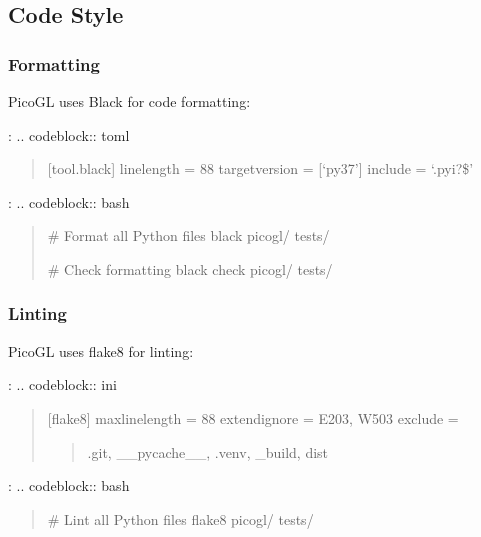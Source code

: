 \documentclass[a4paper,10pt,english,openany,oneside]{sphinxmanual}
\begin{document}
\subsection{Code Style}
\label{\detokenize{contributing:code-style}}

\subsubsection{Formatting}
\label{\detokenize{contributing:formatting}}
\sphinxAtStartPar
PicoGL uses Black for code formatting:

\sphinxAtStartPar
{}:
.. code\sphinxhyphen{}block:: toml
\begin{quote}

\sphinxAtStartPar
{[}tool.black{]}
line\sphinxhyphen{}length = 88
target\sphinxhyphen{}version = {[}‘py37’{]}
include = ‘.pyi?\$’
\end{quote}

\sphinxAtStartPar
{}:
.. code\sphinxhyphen{}block:: bash
\begin{quote}

\sphinxAtStartPar
\# Format all Python files
black picogl/ tests/

\sphinxAtStartPar
\# Check formatting
black \textendash{}check picogl/ tests/
\end{quote}


\subsubsection{Linting}
\label{\detokenize{contributing:linting}}
\sphinxAtStartPar
PicoGL uses flake8 for linting:

\sphinxAtStartPar
{}:
.. code\sphinxhyphen{}block:: ini
\begin{quote}

\sphinxAtStartPar
{[}flake8{]}
max\sphinxhyphen{}line\sphinxhyphen{}length = 88
extend\sphinxhyphen{}ignore = E203, W503
exclude =
\begin{quote}

\sphinxAtStartPar
.git,
\_\_pycache\_\_,
.venv,
\_build,
dist
\end{quote}
\end{quote}

\sphinxAtStartPar
{}:
.. code\sphinxhyphen{}block:: bash
\begin{quote}

\sphinxAtStartPar
\# Lint all Python files
flake8 picogl/ tests/
\end{quote}
\end{document}
